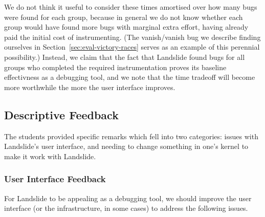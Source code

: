 {We do not think it useful to consider these times amortised over how many bugs were found for each group, because in general we do not know whether each group would have found more bugs with marginal extra effort, having already paid the initial cost of instrumenting. (The vanish/vanish bug we describe finding ourselves in Section~\ref{sec:eval-victory-races} serves as an example of this perennial possibility.)
Instead, we claim that the fact that Landslide found bugs for all groups who completed the required instrumentation proves its baseline effectivness as a debugging tool, and we note that the time tradeoff will become more worthwhile the more the user interface improves.
}

\subsection{Descriptive Feedback}
\label{sec:eval-feedback}

The students provided specific remarks which fell into two categories: issues with Landslide's user interface, and needing to change something in one's kernel to make it work with Landslide.

\subsubsection{User Interface Feedback}

For Landslide to be appealing as a debugging tool, we should improve the user interface (or the infrastructure, in some cases) to address the following issues.

